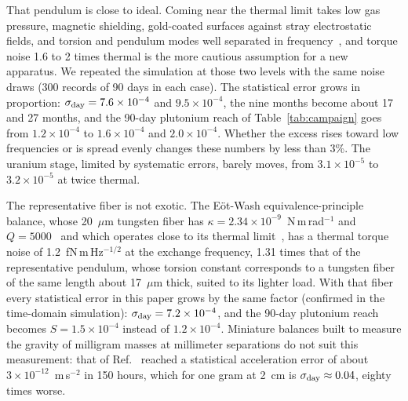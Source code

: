 \documentclass[aps,prd,onecolumn,superscriptaddress,floatfix,nofootinbib]{revtex4-2}
\begin{document}
That pendulum is close to ideal. Coming near the thermal limit takes low gas pressure, magnetic shielding,
gold-coated surfaces against stray electrostatic fields, and torsion and pendulum modes well separated in
frequency~\cite{Adelberger2009}, and torque noise 1.6 to 2 times thermal is the more cautious assumption for a new
apparatus. We repeated the simulation at those two levels with the same noise draws (300 records of 90 days in each
case). The statistical error grows in proportion: $\sigma_{\rm day}=7.6\times10^{-4}$ and $9.5\times10^{-4}$, the
nine months become about 17 and 27 months, and the 90-day plutonium reach of Table~\ref{tab:campaign} goes from
$1.2\times10^{-4}$ to $1.6\times10^{-4}$ and $2.0\times10^{-4}$. Whether the excess rises toward low frequencies or is
spread evenly changes these numbers by less than 3\%. The uranium stage, limited by systematic errors, barely moves,
from $3.1\times10^{-5}$ to $3.2\times10^{-5}$ at twice thermal.

The representative fiber is not exotic. The E\"ot-Wash equivalence-principle balance, whose 20~$\mu$m tungsten fiber
has $\kappa=2.34\times10^{-9}$~N\,m\,rad$^{-1}$ and $Q=5000$~\cite{Schlamminger2008} and which operates close to its
thermal limit~\cite{Wagner2012}, has a thermal torque noise of 1.2~fN\,m\,Hz$^{-1/2}$ at the exchange frequency,
1.31 times that of the representative pendulum, whose torsion constant corresponds to a tungsten fiber of the same
length about 17~$\mu$m thick, suited to its lighter load. With that fiber every statistical error in this paper
grows by the same factor (confirmed in the time-domain simulation): $\sigma_{\rm day}=7.2\times10^{-4}$, and the
90-day plutonium reach becomes $S=1.5\times10^{-4}$ instead of $1.2\times10^{-4}$. Miniature balances built to
measure the gravity of milligram masses at millimeter separations do not suit this measurement: that of
Ref.~\cite{Westphal2021} reached a statistical acceleration error of about $3\times10^{-12}$~m\,s$^{-2}$ in 150 hours,
which for one gram at 2~cm is $\sigma_{\rm day}\approx0.04$, eighty times worse.


\end{document}
